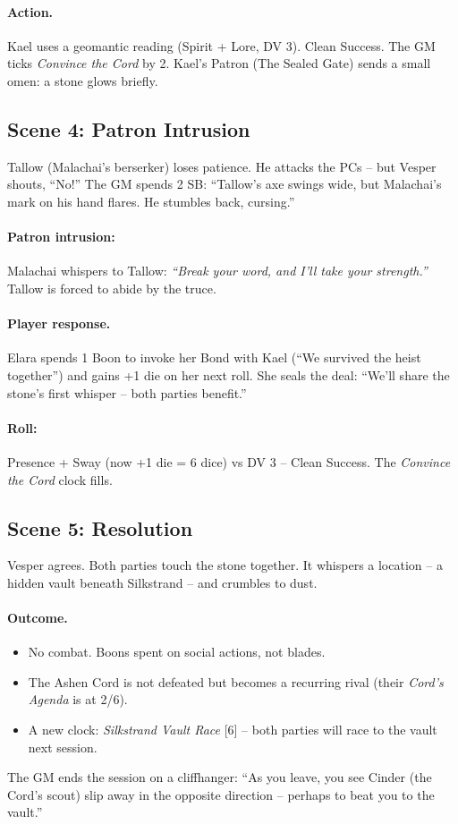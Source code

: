 \paragraph{Action.} Kael uses a geomantic reading (Spirit + Lore, DV 3). Clean Success. The GM ticks \emph{Convince the Cord} by 2. Kael’s Patron (The Sealed Gate) sends a small omen: a stone glows briefly.

\subsection*{Scene 4: Patron Intrusion}
Tallow (Malachai’s berserker) loses patience. He attacks the PCs – but Vesper shouts, “No!” The GM spends 2 SB: “Tallow’s axe swings wide, but Malachai’s mark on his hand flares. He stumbles back, cursing.”

\paragraph{Patron intrusion:} Malachai whispers to Tallow: \emph{“Break your word, and I’ll take your strength.”} Tallow is forced to abide by the truce.

\paragraph{Player response.} Elara spends 1 Boon to invoke her Bond with Kael (“We survived the heist together”) and gains +1 die on her next roll. She seals the deal: “We’ll share the stone’s first whisper – both parties benefit.”

\paragraph{Roll:} Presence + Sway (now +1 die = 6 dice) vs DV 3 – Clean Success. The \emph{Convince the Cord} clock fills.

\subsection*{Scene 5: Resolution}
Vesper agrees. Both parties touch the stone together. It whispers a location – a hidden vault beneath Silkstrand – and crumbles to dust.

\paragraph{Outcome.}
\begin{itemize}
  \item No combat. Boons spent on social actions, not blades.
  \item The Ashen Cord is not defeated but becomes a recurring rival (their \emph{Cord’s Agenda} is at 2/6). 
  \item A new clock: \emph{Silkstrand Vault Race} [6] – both parties will race to the vault next session.
\end{itemize}
The GM ends the session on a cliffhanger: “As you leave, you see Cinder (the Cord’s scout) slip away in the opposite direction – perhaps to beat you to the vault.”

